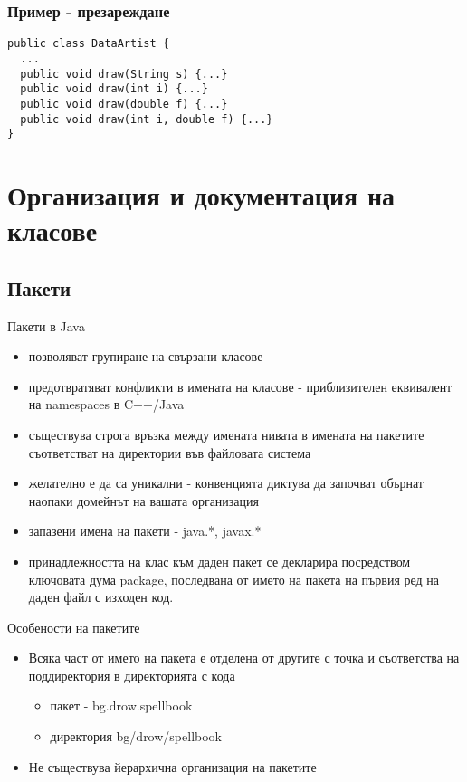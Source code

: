 \documentclass{beamer}
\begin{document}
\begin{frame}[fragile]
  \frametitle{Пример - презареждане}
  \transdissolve
\begin{lstlisting}
public class DataArtist {
  ...
  public void draw(String s) {...}
  public void draw(int i) {...}
  public void draw(double f) {...}
  public void draw(int i, double f) {...}
}
\end{lstlisting}
\end{frame}

\section{Организация и документация на класове}
\subsection{Пакети}
\begin{frame}{Пакети в Java}
  \transdissolve
  \begin{itemize}
  \item позволяват групиране на свързани класове \pause
  \item предотвратяват конфликти в имената на класове - приблизителен
    еквивалент на namespaces в C++/Java \pause
  \item съществува строга връзка между имената нивата в имената на
    пакетите съответстват на директории във файловата система \pause
  \item желателно е да са уникални - конвенцията диктува да започват
    обърнат наопаки домейнът на вашата организация \pause
  \item запазени имена на пакети - java.*, javax.*
  \item принадлежността на клас към даден пакет се декларира
    посредством ключовата дума package, последвана от името на пакета
    на първия ред на даден файл с изходен код.
  \end{itemize}
\end{frame}

\begin{frame}{Особености на пакетите}
  \transdissolve
  \begin{itemize}
  \item Всяка част от името на пакета е отделена от другите с точка и
    съответства на поддиректория в директорията с кода
    \begin{itemize}
    \item пакет - bg.drow.spellbook
    \item директория bg/drow/spellbook
    \end{itemize}
  \item Не съществува йерархична организация на пакетите
  \end{itemize}
\end{frame}
\end{document}
